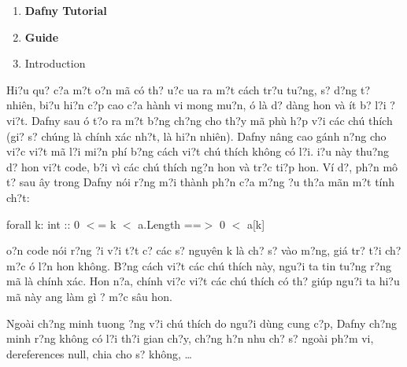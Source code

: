 \documentclass{article} %
\begin{document}
\textbf{ }

\noindent \textbf{}

\noindent \textbf{}

\begin{enumerate}
\item \textbf{ Dafny Tutorial}

\item \textbf{ Guide}

\item  Introduction\underbar{}
\end{enumerate}

Hi?u qu? c?a m?t {\dj}o?n m\~{a} c\'{o} th? {\dj}u?c {\dj}ua ra m?t c\'{a}ch tr?u tu?ng, s? d?ng t? nhi\^{e}n, bi?u hi?n c?p cao c?a h\`{a}nh vi mong mu?n, {\dj}\'{o} l\`{a} d? d\`{a}ng hon v\`{a} \'{i}t b? l?i {\dj}? vi?t. Dafny sau {\dj}\'{o} t?o ra m?t b?ng ch?ng cho th?y m\~{a} ph\`{u} h?p v?i c\'{a}c ch\'{u} th\'{i}ch (gi? s? ch\'{u}ng l\`{a} ch\'{i}nh x\'{a}c nh?t, l\`{a} hi?n nhi\^{e}n). Dafny n\^{a}ng cao g\'{a}nh n?ng cho vi?c vi?t m\~{a} l?i mi?n ph\'{i} b?ng c\'{a}ch vi?t ch\'{u} th\'{i}ch kh\^{o}ng c\'{o} l?i. {\DJ}i?u n\`{a}y thu?ng d? hon vi?t code, b?i v\`{i} c\'{a}c ch\'{u} th\'{i}ch ng?n hon v\`{a} tr?c ti?p hon. V\'{i} d?, ph?n m\^{o} t? sau {\dj}\^{a}y trong Dafny n\'{o}i r?ng m?i th\`{a}nh ph?n c?a m?ng {\dj}?u th?a m\~{a}n m?t t\'{i}nh ch?t:

\noindent forall k: int :: 0 $<$= k $<$ a.Length ==$>$ 0 $<$ a[k]

\noindent 

{\DJ}o?n code n\'{o}i r?ng {\dj}?i v?i t?t c? c\'{a}c s? nguy\^{e}n k l\`{a} ch? s? v\`{a}o m?ng, gi\'{a} tr? t?i ch? m?c {\dj}\'{o} l?n hon kh\^{o}ng. B?ng c\'{a}ch vi?t c\'{a}c ch\'{u} th\'{i}ch n\`{a}y, ngu?i ta tin tu?ng r?ng m\~{a} l\`{a} ch\'{i}nh x\'{a}c. Hon n?a, ch\'{i}nh vi?c vi?t c\'{a}c ch\'{u} th\'{i}ch c\'{o} th? gi\'{u}p ngu?i ta hi?u m\~{a} n\`{a}y {\dj}ang l\`{a}m g\`{i} ? m?c s\^{a}u hon.

Ngo\`{a}i ch?ng minh tuong ?ng v?i ch\'{u} th\'{i}ch do ngu?i d\`{u}ng cung c?p, Dafny ch?ng minh r?ng kh\^{o}ng c\'{o} l?i th?i gian ch?y, ch?ng h?n nhu ch? s? ngo\`{a}i ph?m vi, dereferences null, chia cho s? kh\^{o}ng, {\dots}
\end{document}
